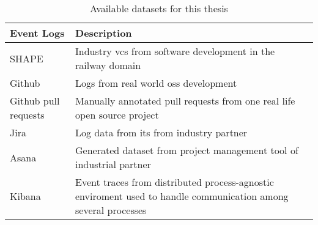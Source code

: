 \begin{table}[]
\centering
\caption{Available datasets for this thesis}
\label{tab:dataset}
\begin{tabular}{@{}m{2.5cm}m{9cm}@{}}
\toprule
\textbf{Event Logs} & \textbf{Description} \\ \midrule
SHAPE & Industry \gls{vcs} from software development in the railway domain \\
Github & Logs from real world \gls{oss} development \\
Github pull requests & Manually annotated pull requests from one real life open source project \\
Jira & Log data from \gls{its} from industry partner \\
Asana & Generated dataset from project management tool of industrial partner \\
Kibana & Event traces from distributed process-agnostic enviroment used to handle communication among several processes \\ \bottomrule
\end{tabular}
\end{table}